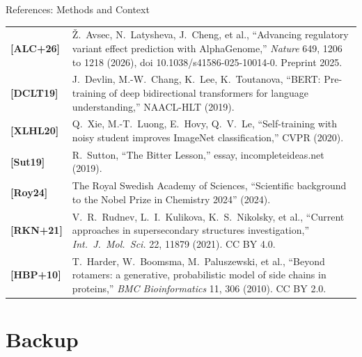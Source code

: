 \documentclass[11pt,aspectratio=169]{beamer}
\newif\ifbackupnumbers   %
\begin{document}
\begin{frame}[t]{References: Methods and Context}
  \vspace{-2mm}
  \scriptsize
  \renewcommand{\arraystretch}{1.25}
  \setlength{\tabcolsep}{1.2mm}
  \begin{tabular}{@{}l>{\raggedright\arraybackslash}p{}@{}}
    \textbf{[ALC+26]} & \v{Z}.~Avsec, N.~Latysheva, J.~Cheng, et al., ``Advancing regulatory variant effect prediction with AlphaGenome,'' \textit{Nature} 649, 1206 to 1218 (2026), doi 10.1038/s41586-025-10014-0. Preprint 2025. \\
    \textbf{[DCLT19]} & J.~Devlin, M.-W.~Chang, K.~Lee, K.~Toutanova, ``BERT: Pre-training of deep bidirectional transformers for language understanding,'' NAACL-HLT (2019). \\
    \textbf{[XLHL20]} & Q.~Xie, M.-T.~Luong, E.~Hovy, Q.~V.~Le, ``Self-training with noisy student improves ImageNet classification,'' CVPR (2020). \\
    \textbf{[Sut19]} & R.~Sutton, ``The Bitter Lesson,'' essay, incompleteideas.net (2019). \\
    \textbf{[Roy24]} & The Royal Swedish Academy of Sciences, ``Scientific background to the Nobel Prize in Chemistry 2024'' (2024). \\
    \textbf{[RKN+21]} & V.~R.~Rudnev, L.~I.~Kulikova, K.~S.~Nikolsky, et al., ``Current approaches in supersecondary structures investigation,'' \textit{Int.\ J.\ Mol.\ Sci.} 22, 11879 (2021). CC BY 4.0. \\
    \textbf{[HBP+10]} & T.~Harder, W.~Boomsma, M.~Paluszewski, et al., ``Beyond rotamers: a generative, probabilistic model of side chains in proteins,'' \textit{BMC Bioinformatics} 11, 306 (2010). CC BY 2.0. \\
  \end{tabular}
\end{frame}

\appendix
\backupnumberstrue   %
\section{Backup}
\end{document}
